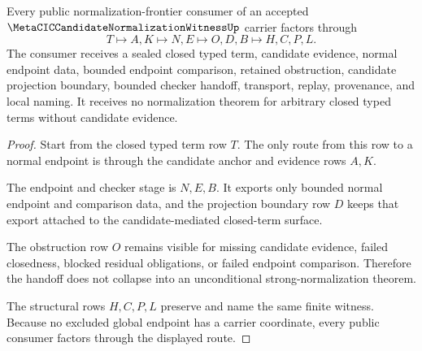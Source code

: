 \begin{theorem}
\label{thm:metacic-candidate-normalization-witness-handoff}
Every public normalization-frontier consumer of an accepted $\MetaCICCandidateNormalizationWitnessUp$ carrier factors through
$$
T \longmapsto A,K \longmapsto N,E \longmapsto O,D,B \longmapsto H,C,P,L .
$$
The consumer receives a sealed closed typed term, candidate evidence, normal endpoint data, bounded endpoint comparison, retained obstruction, candidate projection boundary, bounded checker handoff, transport, replay, provenance, and local naming. It receives no normalization theorem for arbitrary closed typed terms without candidate evidence.
\end{theorem}
\begin{proof}
Start from the closed typed term row $T$. The only route from this row to a normal endpoint is through the candidate anchor and evidence rows $A,K$.

The endpoint and checker stage is $N,E,B$. It exports only bounded normal endpoint and comparison data, and the projection boundary row $D$ keeps that export attached to the candidate-mediated closed-term surface.

The obstruction row $O$ remains visible for missing candidate evidence, failed closedness, blocked residual obligations, or failed endpoint comparison. Therefore the handoff does not collapse into an unconditional strong-normalization theorem.

The structural rows $H,C,P,L$ preserve and name the same finite witness. Because no excluded global endpoint has a carrier coordinate, every public consumer factors through the displayed route.
\end{proof}



